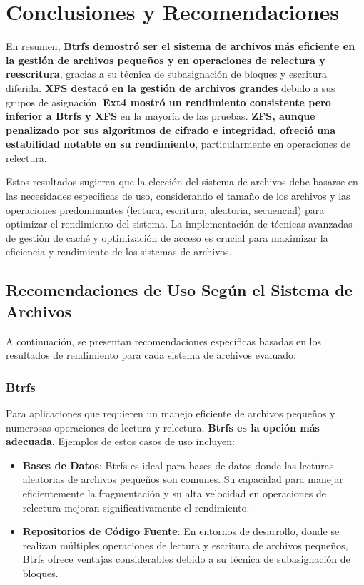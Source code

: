 \chapter{Conclusiones y Recomendaciones}

En resumen, \textbf{Btrfs demostró ser el sistema de archivos más eficiente en la gestión de archivos pequeños y en operaciones de relectura y reescritura}, gracias a su técnica de subasignación de bloques y escritura diferida. \textbf{XFS destacó en la gestión de archivos grandes} debido a sus grupos de asignación. \textbf{Ext4 mostró un rendimiento consistente pero inferior a Btrfs y XFS} en la mayoría de las pruebas. \textbf{ZFS, aunque penalizado por sus algoritmos de cifrado e integridad, ofreció una estabilidad notable en su rendimiento}, particularmente en operaciones de relectura.

Estos resultados sugieren que la elección del sistema de archivos debe basarse en las necesidades específicas de uso, considerando el tamaño de los archivos y las operaciones predominantes (lectura, escritura, aleatoria, secuencial) para optimizar el rendimiento del sistema. La implementación de técnicas avanzadas de gestión de caché y optimización de acceso es crucial para maximizar la eficiencia y rendimiento de los sistemas de archivos.

\section{Recomendaciones de Uso Según el Sistema de Archivos}

A continuación, se presentan recomendaciones específicas basadas en los resultados de rendimiento para cada sistema de archivos evaluado:

\subsection{Btrfs}

Para aplicaciones que requieren un manejo eficiente de archivos pequeños y numerosas operaciones de lectura y relectura, \textbf{Btrfs es la opción más adecuada}. Ejemplos de estos casos de uso incluyen:

\begin{itemize}
    \item \textbf{Bases de Datos}: Btrfs es ideal para bases de datos donde las lecturas aleatorias de archivos pequeños son comunes. Su capacidad para manejar eficientemente la fragmentación y su alta velocidad en operaciones de relectura mejoran significativamente el rendimiento.
    \item \textbf{Repositorios de Código Fuente}: En entornos de desarrollo, donde se realizan múltiples operaciones de lectura y escritura de archivos pequeños, Btrfs ofrece ventajas considerables debido a su técnica de subasignación de bloques.
\end{itemize}

